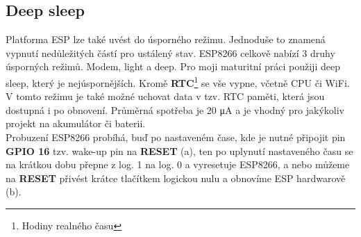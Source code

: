 \documentclass[a4paper, 12pt]{report}
\begin{document}
    \subsection{Deep sleep} \label{subsec:deep-sleep}
    Platforma ESP lze také uvést do úsporného režimu.
    Jednoduše to znamená vypnutí nedůležitých částí pro ustálený stav.
    ESP8266 celkově nabízí 3 druhy úsporných režimů.
    Modem, light a deep.
    Pro moji maturitní práci použiji deep sleep, který je nejúspornějších.
    Kromě \textbf{RTC}\footnote{Hodiny realného času} se vše vypne, včetně CPU či WiFi. V tomto režimu je také možné uchovat data v tzv.
    RTC paměti, která jsou dostupná i po obnovení. Průměrná spotřeba je 20 \si{\micro A} a je vhodný pro jakýkoliv projekt na akumulátor či baterii. \\
    Probuzení ESP8266 probíhá, buď po nastaveném čase, kde je nutné připojit pin \textbf{GPIO 16} tzv. wake-up pin na \textbf{RESET} (a), ten po uplynutí nastaveného času se na krátkou dobu přepne z log. 1 na log. 0 a vyresetuje ESP8266, a nebo můžeme na \textbf{RESET}  přivést krátce tlačítkem logickou nulu a obnovíme ESP hardwarově (b).
\end{document}
